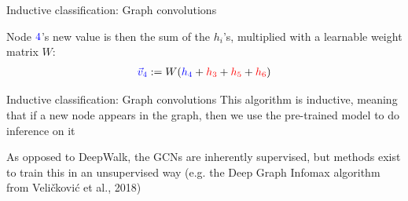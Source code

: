 \documentclass{beamer}
\begin{document}
\begin{frame}{Inductive classification: Graph convolutions}

  Node $\color{blue}4$'s new value is then the sum of the $h_i$'s, multiplied
  with a learnable weight matrix $W$:
  \begin{align*}
    {\color{blue}\vec v_4} := W({\color{blue}h_4} + {\color{red}h_3} + 
    {\color{red}h_5} + {\color{red}h_6})
  \end{align*}

  \begin{center}
  \end{center}
\end{frame}

\begin{frame}{Inductive classification: Graph convolutions}
  This algorithm is \alert<1>{inductive}, meaning that if a new node appears 
  in the graph, then we use the pre-trained model to do inference on it

  \pause As opposed to DeepWalk, the GCNs are inherently 
  \alert<2>{supervised}, but methods exist to train this in an unsupervised 
  way (e.g. the Deep Graph Infomax algorithm from 
  Veli\v ckovi\'c et al., 2018)
\end{frame}

\end{document}
